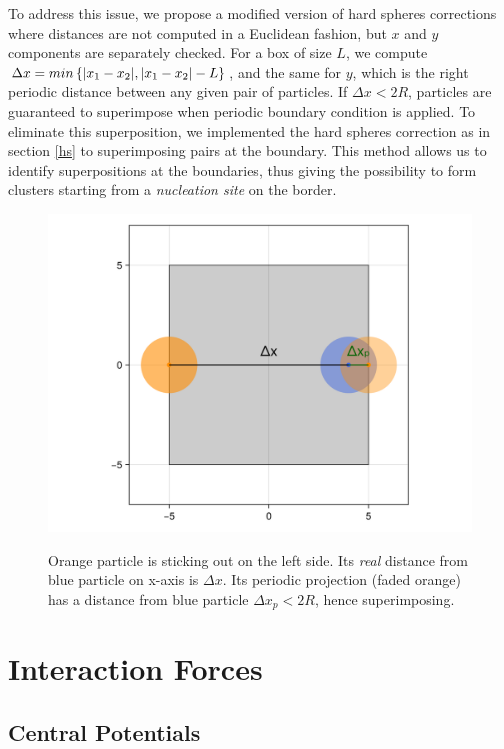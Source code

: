 \documentclass[../../master_thesis_np.tex]{subfiles}
\begin{document}
	To address this issue, we propose a modified version of hard spheres corrections where distances are not computed in a Euclidean fashion, but $x$ and $y$ components are separately checked.
	For a box of size $L$, we compute $\Delta x = min \left\{ \abs{x_1-x_2}, \abs{x_1-x_2}-L \right\}$, and the same for $y$, which is the right periodic distance between any given pair of particles.
	If $\Delta x < 2R$, particles are guaranteed to superimpose when periodic boundary condition is applied.
	To eliminate this superposition, we implemented the hard spheres correction as in section \ref{hs} to superimposing pairs at the boundary.
	This method allows us to identify superpositions at the boundaries, thus giving the possibility to form clusters starting from a \emph{nucleation site} on the border. 
	
	\begin{figure}[htp]
		\centering
		\includegraphics[width = \textwidth]{periodic_hs.png}
		\label{fig:periodic_hs}
		\caption{Orange particle is sticking out on the left side. Its \emph{real} distance from blue particle on x-axis is $\Delta x$. Its periodic projection (faded orange) has a distance from blue particle $\Delta x_p < 2R$, hence superimposing.}
	\end{figure}

	\section{Interaction Forces}
	
	\subsection{Central Potentials}
\end{document}
